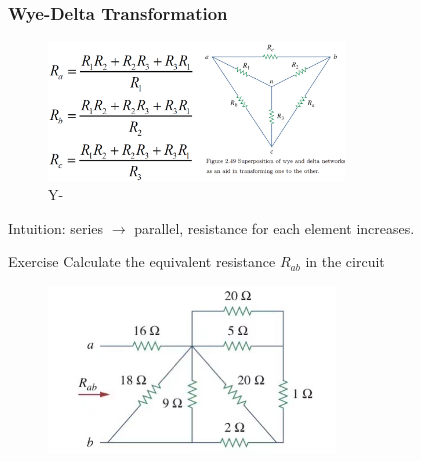 \documentclass{beamer}
\begin{document}
\begin{frame}
\frametitle{Wye-Delta Transformation}
\begin{figure}[H]
\centering
\includegraphics[width=0.7\textwidth]{35.png}
\caption{Y-\Delta}
\end{figure}

Intuition: series $\rightarrow$ parallel, resistance for each element increases.

\end{frame}

\begin{frame}{Exercise}
Calculate the equivalent resistance $R_{ab}$ in the circuit
\begin{figure}
\centering
\includegraphics[width=3in]{32.jpg}
\end{figure}
\end{frame}
\end{document}

